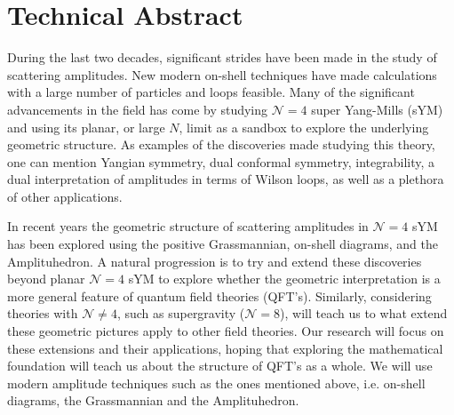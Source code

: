 \documentclass[]{article}
\title{}
\author{Taro V. Brown}
\begin{document}
\maketitle

\section*{Technical Abstract}
During the last two decades, significant strides have been made in the study of scattering amplitudes. New modern on-shell techniques have made calculations with a large number of particles and loops feasible. Many of the significant advancements in the field has come by studying $\mathcal{N} = 4$ super Yang-Mills (sYM) and using its planar, or large $N$, limit as a sandbox to explore the underlying geometric structure.
As examples of the discoveries made studying this theory, one can mention Yangian symmetry, dual conformal symmetry, integrability, a dual interpretation of amplitudes in terms of Wilson loops, as well as a plethora of other applications.

In recent years the geometric structure of scattering amplitudes in $\mathcal{N}=4$ sYM has been explored using the positive Grassmannian, on-shell diagrams, and the Amplituhedron. A natural progression is to try and extend these discoveries beyond planar $\mathcal{N}=4$ sYM to explore whether the geometric interpretation is a more general feature of quantum field theories (QFT's). Similarly, considering theories with $\mathcal{N}\neq4$, such as supergravity ($
\mathcal{N}=8$), will teach us to what extend these geometric pictures apply to other field theories. Our research will focus on these extensions and their applications, hoping that exploring the mathematical foundation will teach us about the structure of QFT's as a whole. We will use modern amplitude techniques such as the ones mentioned above, i.e. on-shell diagrams, the Grassmannian and the Amplituhedron.
\end{document}
